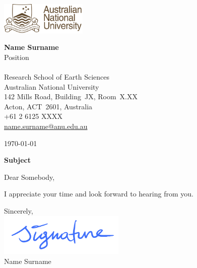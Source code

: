 \documentclass[11pt]{article}
\begin{document}
\parbox{.5\linewidth}
{
\begin{flushleft}
\includegraphics[height=0.6in]{ANU_logo}\\
\vspace{7em}
\end{flushleft}
}
\parbox{.5\linewidth}
{
\begin{flushright}
{\bf Name Surname}\\
Position\\
\mbox{}\\
Research School of Earth Sciences\\
Australian National University\\
142 Mills Road, Building~JX, Room~X.XX\\
Acton, ACT~2601, Australia\\
+61 2 6125 XXXX\\
\href{mailto:name.surname@anu.edu.au}{name.surname@anu.edu.au}
\end{flushright}
}



\today



\vspace{3em}

\begin{center}\textbf{Subject}\end{center}


Dear Somebody,

\lipsum[1-1]


I appreciate your time and look forward to hearing from you.

\bigskip

Sincerely,\\
\includegraphics[width=6cm]{signature}\\[.25cm]
Name Surname
\end{document}
